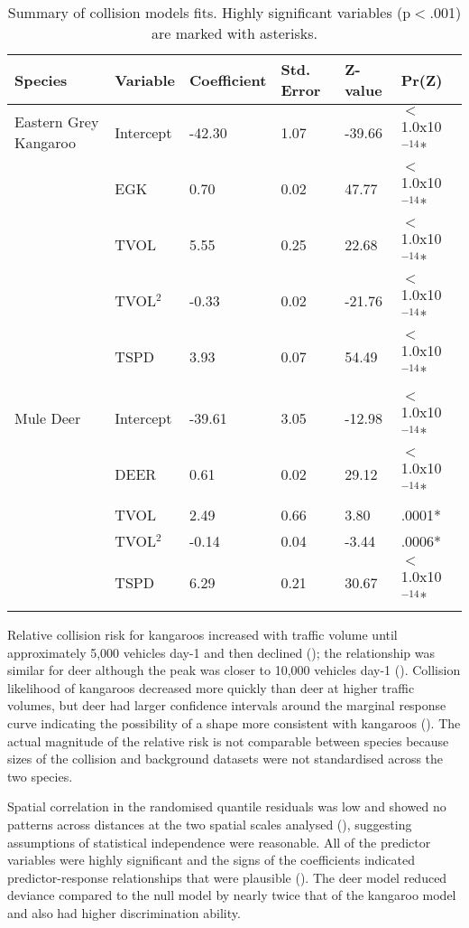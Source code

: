 \begin{table}[htp]
\caption{Summary of collision models fits.  Highly significant variables (p$<$.001) are marked with asterisks.}
\begin{tabularx}{\textwidth}{llllll} \toprule
Species					&Variable		&Coefficient	&Std. Error		&Z-value	&Pr(Z) \\ \midrule
Eastern Grey Kangaroo	&Intercept		&-42.30			&1.07			&-39.66		&$<$1.0x10$^{-14}$* \\
						&EGK			&0.70			&0.02			&47.77		&$<$1.0x10$^{-14}$* \\
						&TVOL			&5.55			&0.25			&22.68		&$<$1.0x10$^{-14}$* \\
						&TVOL$^2$		&-0.33			&0.02			&-21.76		&$<$1.0x10$^{-14}$* \\
						&TSPD			&3.93			&0.07			&54.49		&$<$1.0x10$^{-14}$* \\
&&&&& \\
Mule Deer				&Intercept		&-39.61			&3.05			&-12.98		&$<$1.0x10$^{-14}$* \\
						&DEER			&0.61			&0.02			&29.12		&$<$1.0x10$^{-14}$* \\
						&TVOL			&2.49			&0.66			&3.80		&.0001* \\
						&TVOL$^2$		&-0.14			&0.04			&-3.44		&.0006* \\
						&TSPD			&6.29			&0.21			&30.67		&$<$1.0x10$^{-14}$* \\
\bottomrule
\end{tabularx}
\label{cal_model_fits}
\end{table}

Relative collision risk  for kangaroos increased with traffic volume until approximately 5,000 vehicles day-1 and then declined (); the relationship was similar for deer although the peak was closer to 10,000 vehicles day-1 (). Collision likelihood of kangaroos decreased more quickly than deer at higher traffic volumes, but deer had larger confidence intervals around the marginal response curve indicating the possibility of a shape more consistent with kangaroos (). The actual magnitude of the relative risk is not comparable between species because sizes of the collision and background datasets were not standardised across the two species.

Spatial correlation in the randomised quantile residuals was low and showed no patterns across distances at the two spatial scales analysed (), suggesting assumptions of statistical independence were reasonable. All of the predictor variables were highly significant and the signs of the coefficients indicated predictor-response relationships that were plausible (). The deer model reduced deviance compared to the null model by nearly twice that of the kangaroo model and also had higher discrimination ability.


